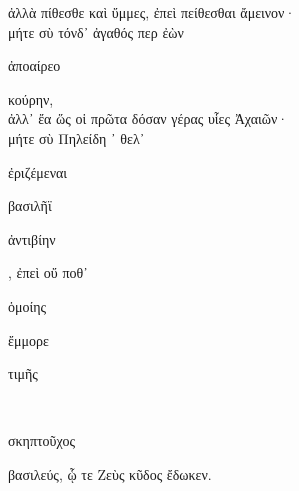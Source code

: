 \documentclass{ransom}
\begin{document}
\begin{foreignpage}
\begin{graytext}
ἀλλὰ πίθεσθε καὶ ὔμμες, ἐπεὶ πείθεσθαι ἄμεινον·\\
μήτε σὺ τόνδ᾽ ἀγαθός περ ἐὼν \begin{whitetext}ἀποαίρεο\end{whitetext} κούρην,\hfill{}\\
ἀλλ᾽ ἔα ὥς οἱ πρῶτα δόσαν γέρας υἷες Ἀχαιῶν·\\
μήτε σὺ Πηλείδη ᾽ θελ᾽ \begin{whitetext}ἐριζέμεναι\end{whitetext} βασιλῆϊ\\
\begin{whitetext}ἀντιβίην\end{whitetext}, ἐπεὶ οὔ ποθ᾽ \begin{whitetext}ὁμοίης\end{whitetext} \begin{whitetext}ἔμμορε\end{whitetext} \begin{whitetext}τιμῆς\end{whitetext}\\
\begin{whitetext}σκηπτοῦχος\end{whitetext} βασιλεύς, ᾧ τε Ζεὺς κῦδος ἔδωκεν.\\

\end{graytext}


\end{foreignpage}
\end{document}

